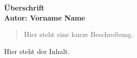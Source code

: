 \documentclass[a4paper,10pt]{article}
\begin{document}
\vspace*{1cm}

{\bfseries \large Überschrift \\[1mm]
\normalfont Autor: Vorname Name}					%

\vspace{1cm}

\begin{abstract}
	Hier steht eine kurze Beschreibung.
\end{abstract}

\vspace{1cm}

Hier steht der Inhalt.
\end{document}
